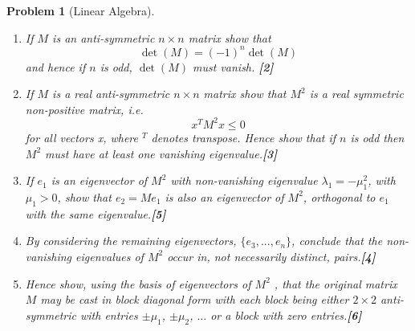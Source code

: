 \documentclass[a4paper]{article}
\theoremstyle{new}
\newtheorem{qns}{Problem}[section]
\begin{document}
\newpage
\begin{qns}[Linear Algebra]\leavevmode
\begin{enumerate}[label=(\roman*)]
\item If $M$ is an anti-symmetric $n\times n$ matrix show that
$$\det(M) = (−1)^{n}\det(M)$$
and hence if $n$ is odd, $\det(M)$ must vanish. \hfill \textbf{[2]}
\item If $M$ is a real anti-symmetric $n\times n$ matrix show that $M^2$ is a real symmetric non-positive matrix, i.e. $$x^TM^2x\leq0$$
for all vectors x, where $^T$ denotes transpose. Hence show that if $n$ is odd then $M^2$ must have at least one vanishing eigenvalue.\hfill \textbf{[3]}
\item If $e_1$ is an eigenvector of $M^2$ with non-vanishing eigenvalue $\lambda_1=-\mu_1^2$, with $\mu_1>0$,
show that $e_2 = Me_1$ is also an eigenvector of $M^2$, orthogonal to $e_1$ with the same eigenvalue.\hfill \textbf{[5]}
\item By considering the remaining eigenvectors, $\{e_3,...,e_n\}$, conclude that the non-vanishing eigenvalues of $M^2$ occur in, not necessarily distinct, pairs.\hfill \textbf{[4]}
\item Hence show, using the basis of eigenvectors of $M^2$ , that the original matrix $M$ may be cast in block diagonal form with each block being either $2\times 2$ anti-symmetric with entries $\pm\mu_1$, $\pm\mu_2$, $\dots$ or a block with zero entries.\hfill \textbf{[6]}
\end{enumerate}
\end{qns}
\end{document}
